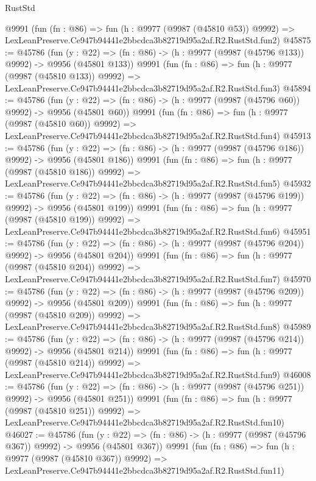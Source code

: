 \begin{lexlean}{RustStd}
\begin{coremodule}
    @9991
    (fun (fn : @86) =>
    fun (h : @9977 (@9987 (@45810 @53)) @9992) =>
    LexLeanPreserve.Ce947b94441e2bbcdca3b82719d95a2af.R2.RustStd.fun2)
@45875 := @45786
    (fun (y : @22) => (fn : @86) -> (h : @9977 (@9987 (@45796 @133)) @9992) -> @9956 (@45801 @133))
    @9991
    (fun (fn : @86) =>
    fun (h : @9977 (@9987 (@45810 @133)) @9992) =>
    LexLeanPreserve.Ce947b94441e2bbcdca3b82719d95a2af.R2.RustStd.fun3)
@45894 := @45786
    (fun (y : @22) => (fn : @86) -> (h : @9977 (@9987 (@45796 @60)) @9992) -> @9956 (@45801 @60))
    @9991
    (fun (fn : @86) =>
    fun (h : @9977 (@9987 (@45810 @60)) @9992) =>
    LexLeanPreserve.Ce947b94441e2bbcdca3b82719d95a2af.R2.RustStd.fun4)
@45913 := @45786
    (fun (y : @22) => (fn : @86) -> (h : @9977 (@9987 (@45796 @186)) @9992) -> @9956 (@45801 @186))
    @9991
    (fun (fn : @86) =>
    fun (h : @9977 (@9987 (@45810 @186)) @9992) =>
    LexLeanPreserve.Ce947b94441e2bbcdca3b82719d95a2af.R2.RustStd.fun5)
@45932 := @45786
    (fun (y : @22) => (fn : @86) -> (h : @9977 (@9987 (@45796 @199)) @9992) -> @9956 (@45801 @199))
    @9991
    (fun (fn : @86) =>
    fun (h : @9977 (@9987 (@45810 @199)) @9992) =>
    LexLeanPreserve.Ce947b94441e2bbcdca3b82719d95a2af.R2.RustStd.fun6)
@45951 := @45786
    (fun (y : @22) => (fn : @86) -> (h : @9977 (@9987 (@45796 @204)) @9992) -> @9956 (@45801 @204))
    @9991
    (fun (fn : @86) =>
    fun (h : @9977 (@9987 (@45810 @204)) @9992) =>
    LexLeanPreserve.Ce947b94441e2bbcdca3b82719d95a2af.R2.RustStd.fun7)
@45970 := @45786
    (fun (y : @22) => (fn : @86) -> (h : @9977 (@9987 (@45796 @209)) @9992) -> @9956 (@45801 @209))
    @9991
    (fun (fn : @86) =>
    fun (h : @9977 (@9987 (@45810 @209)) @9992) =>
    LexLeanPreserve.Ce947b94441e2bbcdca3b82719d95a2af.R2.RustStd.fun8)
@45989 := @45786
    (fun (y : @22) => (fn : @86) -> (h : @9977 (@9987 (@45796 @214)) @9992) -> @9956 (@45801 @214))
    @9991
    (fun (fn : @86) =>
    fun (h : @9977 (@9987 (@45810 @214)) @9992) =>
    LexLeanPreserve.Ce947b94441e2bbcdca3b82719d95a2af.R2.RustStd.fun9)
@46008 := @45786
    (fun (y : @22) => (fn : @86) -> (h : @9977 (@9987 (@45796 @251)) @9992) -> @9956 (@45801 @251))
    @9991
    (fun (fn : @86) =>
    fun (h : @9977 (@9987 (@45810 @251)) @9992) =>
    LexLeanPreserve.Ce947b94441e2bbcdca3b82719d95a2af.R2.RustStd.fun10)
@46027 := @45786
    (fun (y : @22) => (fn : @86) -> (h : @9977 (@9987 (@45796 @367)) @9992) -> @9956 (@45801 @367))
    @9991
    (fun (fn : @86) =>
    fun (h : @9977 (@9987 (@45810 @367)) @9992) =>
    LexLeanPreserve.Ce947b94441e2bbcdca3b82719d95a2af.R2.RustStd.fun11)

\end{coremodule}
\end{lexlean}
